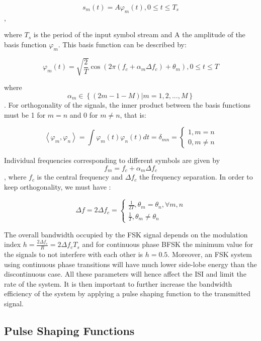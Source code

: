\documentclass[12pt,a4paper,openright]{article}
\begin{document}
\[{s_m}(t) = A{\varphi _m}(t),0 \le t \le T_s\],

where $T_s$ is the period of the input symbol stream and A the amplitude of the basis function $\varphi_m$. This basis function can be described by:

\[{\varphi _m}(t) = \sqrt {\frac{2}{T}} \cos \left( {2\pi ({f_c} + {\alpha _m}\Delta {f_c}) + {\theta _m}} \right),0 \le t \le T\]


where \[{\alpha _m} \in \left\{ {(2m - 1 - M)|m = 1,2,...,M} \right\}\]. For orthogonality of the signals, the inner product between the basis functions must be 1 for $m=n$ and 0 for $m\neq n$, that is: 

\[\left\langle {\left. {{\varphi _m},{\varphi _n}} \right\rangle } \right. = \int {{\varphi _m}(t){\varphi _n}(t)dt = {\delta _{mn}} = \left\{ \begin{array}{l}
1,m = n\\
0,m \ne n
\end{array} \right.} \]


Individual frequencies corresponding to different symbols are given by \[{f_m} = {f_c} + {\alpha _m}\Delta {f_c}\], where $f_c$ is the central frequency and $\Delta f_c$ the frequency separation. In order to keep orthogonality, we must have \cite{gold}:

\[\Delta {f}= 2\Delta {f_c} = \left\{ \begin{array}{l}
\frac{1}{{2T}},{\theta _m} = {\theta _n},\forall m,n\\
\frac{1}{T},{\theta _m} \ne {\theta _n}
\end{array} \right.\]

The overall bandwidth occupied by the FSK signal depends on the modulation index $h=\frac{2\Delta {f_c}}{R}=2\Delta {f_c}T_s$ and for continuous phase BFSK the minimum value for the signals to not interfere with each other is $h=0.5$. Moreover, an FSK system using continuous phase transitions will have much lower side-lobe energy than the discontinuous case. All these parameters will hence affect the ISI and limit the rate of the system. It is then important to further increase the bandwidth efficiency of the system by applying a pulse shaping function to the transmitted signal.

\subsection{Pulse Shaping Functions}
\end{document}
